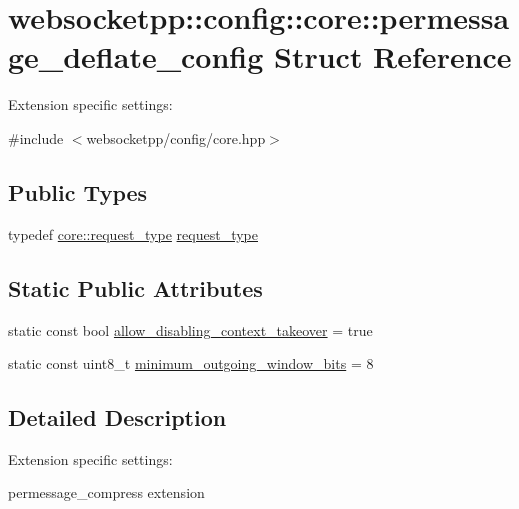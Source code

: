 \hypertarget{structwebsocketpp_1_1config_1_1core_1_1permessage__deflate__config}{}\section{websocketpp\+:\+:config\+:\+:core\+:\+:permessage\+\_\+deflate\+\_\+config Struct Reference}
\label{structwebsocketpp_1_1config_1_1core_1_1permessage__deflate__config}


Extension specific settings\+:  




{\ttfamily \#include $<$websocketpp/config/core.\+hpp$>$}

\subsection*{Public Types}
\begin{DoxyCompactItemize}
\item 
typedef \hyperlink{structwebsocketpp_1_1config_1_1core_a6b17eee7cb81f247afc8f3d7b3a3fc9e}{core\+::request\+\_\+type} \hyperlink{structwebsocketpp_1_1config_1_1core_1_1permessage__deflate__config_aba198d4d1a05699588fb13335b57b38c}{request\+\_\+type}
\end{DoxyCompactItemize}
\subsection*{Static Public Attributes}
\begin{DoxyCompactItemize}
\item 
static const bool \hyperlink{structwebsocketpp_1_1config_1_1core_1_1permessage__deflate__config_ac9b85348637f891c2965e15532a7018e}{allow\+\_\+disabling\+\_\+context\+\_\+takeover} = true
\item 
static const uint8\+\_\+t \hyperlink{structwebsocketpp_1_1config_1_1core_1_1permessage__deflate__config_aa43d8526e2b89349b3fd9a5372507594}{minimum\+\_\+outgoing\+\_\+window\+\_\+bits} = 8
\end{DoxyCompactItemize}


\subsection{Detailed Description}
Extension specific settings\+: 

permessage\+\_\+compress extension 

